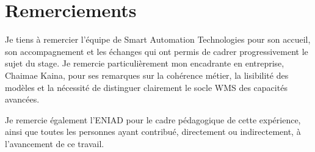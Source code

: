 \chapter*{Remerciements}
Je tiens à remercier l'équipe de Smart Automation Technologies pour son accueil, son accompagnement et les échanges qui ont permis de cadrer progressivement le sujet du stage. Je remercie particulièrement mon encadrante en entreprise, Chaimae Kaina, pour ses remarques sur la cohérence métier, la lisibilité des modèles et la nécessité de distinguer clairement le socle WMS des capacités avancées.

Je remercie également l'ENIAD pour le cadre pédagogique de cette expérience, ainsi que toutes les personnes ayant contribué, directement ou indirectement, à l'avancement de ce travail.

